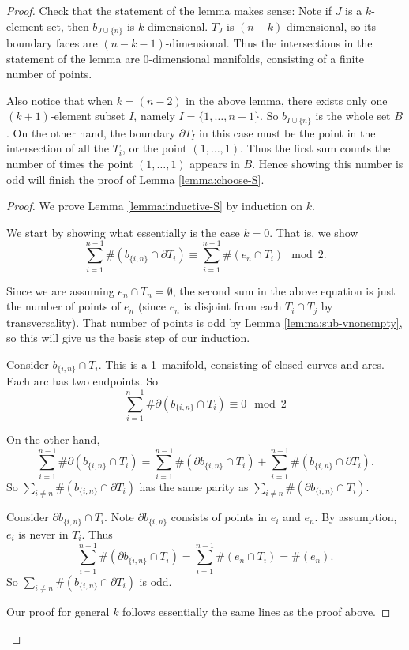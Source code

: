 \begin{proof}
Check that the statement of the lemma makes sense:  Note if $J$ is a
$k$-element set, then $b_{J\cup\{n\}}$ is $k$-dimensional.  $T_J$ is
$(n-k)$ dimensional, so its boundary faces are $(n-k-1)$-dimensional.
Thus the intersections in the statement of the lemma are
$0$-dimensional manifolds, consisting of a finite number of
points.

Also notice that when $k=(n-2)$ in the above lemma, there exists only
one $(k+1)$-element subset $I$, namely $I=\{1, \dots, n-1\}$.  So
$b_{I\cup\{n\}}$ is the whole set $B$.  On the other hand, the
boundary $\partial T_I$ in this case must be the point in the
intersection of all the $T_i$, or the point $(1, \dots, 1)$.  Thus the
first sum counts the number of times the point $(1, \dots, 1)$ appears
in $B$.  Hence showing this number is odd will finish the
proof of Lemma \ref{lemma:choose-S}.


\begin{proof}
We prove Lemma \ref{lemma:inductive-S} by induction on $k$.

We start by showing what essentially is the case $k=0$.  That is, we
show
$$\sum_{i=1}^{n-1} \#(b_{\{i,n\}} \cap \partial T_i) \equiv
\sum_{i=1}^{n-1} \#(e_n \cap T_i) \mod 2.$$

Since we are assuming $e_n \cap T_n = \emptyset$, the second sum in
the above equation is just the number of points of $e_n$ (since $e_n$
is disjoint from each $T_i \cap T_j$ by transversality).  That number
of points is odd by Lemma \ref{lemma:sub-vnonempty}, so this will give
us the basis step of our induction.

Consider $b_{\{i, n\}} \cap T_i$.  This is a 1--manifold, consisting
of closed curves and arcs.  Each arc has two endpoints.  So
$$\sum_{i=1}^{n-1} \#\partial(b_{\{i,n\}} \cap T_i) \equiv 0 \mod 2$$

On the other hand,
$$\sum_{i=1}^{n-1} \#\partial(b_{\{i,n\}} \cap T_i) =
\sum_{i=1}^{n-1} \#(\partial b_{\{i,n\}} \cap T_i) +
\sum_{i=1}^{n-1} \#(b_{\{i,n\}} \cap \partial T_i).$$
So $\sum_{i\neq n} \#(b_{\{i,n\}} \cap \partial T_i)$ has the same
parity as $\sum_{i\neq n} \#(\partial b_{\{i,n\}} \cap T_i)$.

Consider $\partial b_{\{i,n\}} \cap T_i$.  Note $\partial b_{\{i,n\}}$
consists of points in $e_i$ and $e_n$.  By assumption, $e_i$ is never
in $T_i$.  Thus
$$\sum_{i=1}^{n-1} \#(\partial b_{\{i,n\}} \cap T_i)
= \sum_{i=1}^{n-1} \#(e_n \cap T_i) = \#(e_n).$$
So $\sum_{i\neq n} \#(b_{\{i,n\}} \cap \partial T_i)$ is odd.

Our proof for general $k$ follows essentially the same lines as the
proof above.


\end{proof}
\end{proof}
